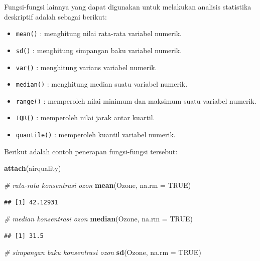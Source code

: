 \documentclass[]{book}
\newenvironment{Shaded}{\begin{snugshade}}{\end{snugshade}}
\newcommand{\CommentTok}[1]{\textcolor[rgb]{0.56,0.35,0.01}{\textit{#1}}}
\newcommand{\DataTypeTok}[1]{\textcolor[rgb]{0.13,0.29,0.53}{#1}}
\newcommand{\KeywordTok}[1]{\textcolor[rgb]{0.13,0.29,0.53}{\textbf{#1}}}
\newcommand{\NormalTok}[1]{#1}
\newcommand{\OtherTok}[1]{\textcolor[rgb]{0.56,0.35,0.01}{#1}}
\providecommand{\tightlist}{%
  \setlength{\itemsep}{0pt}\setlength{\parskip}{0pt}}
\theoremstyle{definition}
\theoremstyle{definition}
\theoremstyle{definition}
\theoremstyle{remark}
\begin{document}
Fungsi-fungsi lainnya yang dapat digunakan untuk melakukan analisis statistika deskriptif adalah sebagai berikut:

\begin{itemize}
\tightlist
\item
  \texttt{mean()} : menghitung nilai rata-rata variabel numerik.
\item
  \texttt{sd()} : menghitung simpangan baku variabel numerik.
\item
  \texttt{var()} : menghitung varians variabel numerik.
\item
  \texttt{median()} : menghitung median suatu variabel numerik.
\item
  \texttt{range()} : memperoleh nilai minimum dan maksimum suatu variabel numerik.
\item
  \texttt{IQR()} : memperoleh nilai jarak antar kuartil.
\item
  \texttt{quantile()} : memperoleh kuantil variabel numerik.
\end{itemize}

Berikut adalah contoh penerapan fungsi-fungsi tersebut:

\begin{Shaded}
\begin{Highlighting}[]
\KeywordTok{attach}\NormalTok{(airquality)}

\CommentTok{# rata-rata konsentrasi ozon}
\KeywordTok{mean}\NormalTok{(Ozone, }\DataTypeTok{na.rm =} \OtherTok{TRUE}\NormalTok{)}
\end{Highlighting}
\end{Shaded}

\begin{verbatim}
## [1] 42.12931
\end{verbatim}

\begin{Shaded}
\begin{Highlighting}[]
\CommentTok{# median konsentrasi ozon}
\KeywordTok{median}\NormalTok{(Ozone, }\DataTypeTok{na.rm =} \OtherTok{TRUE}\NormalTok{)}
\end{Highlighting}
\end{Shaded}

\begin{verbatim}
## [1] 31.5
\end{verbatim}

\begin{Shaded}
\begin{Highlighting}[]
\CommentTok{# simpangan baku konsentrasi ozon}
\KeywordTok{sd}\NormalTok{(Ozone, }\DataTypeTok{na.rm =} \OtherTok{TRUE}\NormalTok{)}
\end{Highlighting}
\end{Shaded}
\end{document}
